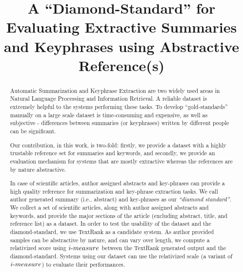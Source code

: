 \documentclass{sig-alternate-05-2015}
\begin{document}
\title{A ``Diamond-Standard'' for Evaluating Extractive Summaries and Keyphrases using Abstractive Reference(s)}
\maketitle
\begin{abstract}
Automatic Summarization and Keyphrase Extraction are two widely used areas in Natural Language Processing and Information Retrieval. A reliable dataset is extremely helpful to the systems performing these tasks. To develop ``gold-standards'' manually on a large scale dataset is time-consuming and expensive, as well as subjective - differences between summaries (or keyphrases) written by different people can be significant. 

\par Our contribution, in this work, is two-fold: firstly, we provide a dataset with a highly trustable reference set for summaries and keywords, and secondly, we provide an evaluation mechanism for systems that are mostly extractive whereas the references are by nature abstractive.

\par In case of scientific articles, author assigned abstracts and key-phrases can provide a high quality reference for summarization and key-phrase extraction tasks. We call author generated summary (i.e., abstract) and key-phrases as our \emph{``diamond standard''}. We collect a set of scientific articles, along with author assigned abstracts and keywords, and provide the major sections of the article (excluding abstract, title, and reference list) as a dataset. In order to test the usability of the dataset and the diamond-standard, we use TextRank as a candidate system. As author provided samples can be abstractive by nature, and can vary over length, we compute a relativized score using $i\hbox{-}measure$ between the TextRank generated output and the diamond-standard. Systems using our dataset can use the relativized scale (a variant of $i\hbox{-}measure$) to evaluate their performances.
\end{abstract}

\end{document}
